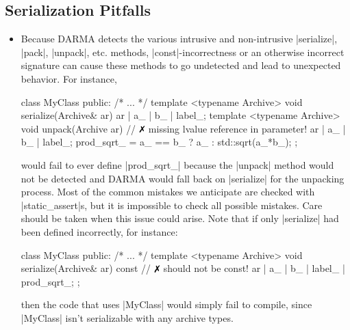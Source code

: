 \subsection{Serialization Pitfalls}

\begin{itemize}
  \item Because \gls{DARMA} detects the various intrusive and non-intrusive
  |serialize|, |pack|, |unpack|, etc. methods, |const|-incorrectness or an
  otherwise incorrect signature can cause these methods to go undetected and
  lead to unexpected behavior.  For instance,
\begin{CppCodeNumb}
class MyClass {
  public:
    /* ... */
    template <typename Archive>
    void serialize(Archive& ar) {
      ar | a_ | b_ | label_;
    }
    template <typename Archive>
    void unpack(Archive ar) { // $\no$ missing lvalue reference in parameter!
      ar | a_ | b_ | label_;
      prod_sqrt_ = a_ == b_ ? a_ : std::sqrt(a_*b_);
    }
};
\end{CppCodeNumb}
would fail to ever define |prod_sqrt_| because the |unpack| method would not be
detected and \gls{DARMA} would fall back on |serialize| for the unpacking process. 
Most of the common mistakes we anticipate are checked with |static_assert|s, but
it is impossible to check all possible mistakes.  Care should be taken when this
issue could arise.  Note that if only |serialize| had been defined incorrectly,
for instance:
\begin{CppCodeNumb}
class MyClass {
  public:
    /* ... */
    template <typename Archive>
    void serialize(Archive& ar) const { // $\no$ should not be const!
      ar | a_ | b_ | label_ | prod_sqrt_;
    }
};
\end{CppCodeNumb}
then the code that uses |MyClass| would simply fail to compile, since |MyClass|
isn't serializable with any archive types.
\end{itemize}

\lstDeleteShortInline{\|}
